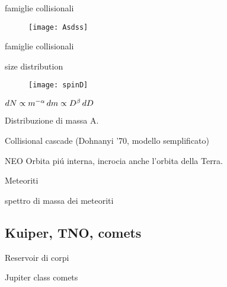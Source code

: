 \begin{frame}{famiglie collisionali}
\begin{figure}[!ht]
\texttt{[image: Asdss]}
\end{figure}
\end{frame}

\begin{wordonframe}{famiglie collisionali}

\end{wordonframe}

\begin{frame}{size distribution}
\begin{figure}[!ht]\texttt{[image: spinD]}
\end{figure}
$dN\propto m^{-\alpha}\,dm\propto D^{\beta}\,dD$
\end{frame}

\begin{wordonframe}{Distribuzione di massa A.}
\begin{block}{Collisional cascade (Dohnanyi '70, modello semplificato)}

\end{block}
\end{wordonframe}

\begin{frame}{NEO}
Orbita pi\'u interna, incrocia anche l'orbita della Terra.
\end{frame}

\begin{frame}{Meteoriti}

\end{frame}

\begin{wordonframe}{spettro di massa dei meteoriti}

\end{wordonframe}

\subsection{Kuiper, TNO, comets}

\begin{frame}{Reservoir di corpi}

\end{frame}

\begin{wordonframe}{Jupiter class comets}

\end{wordonframe}

